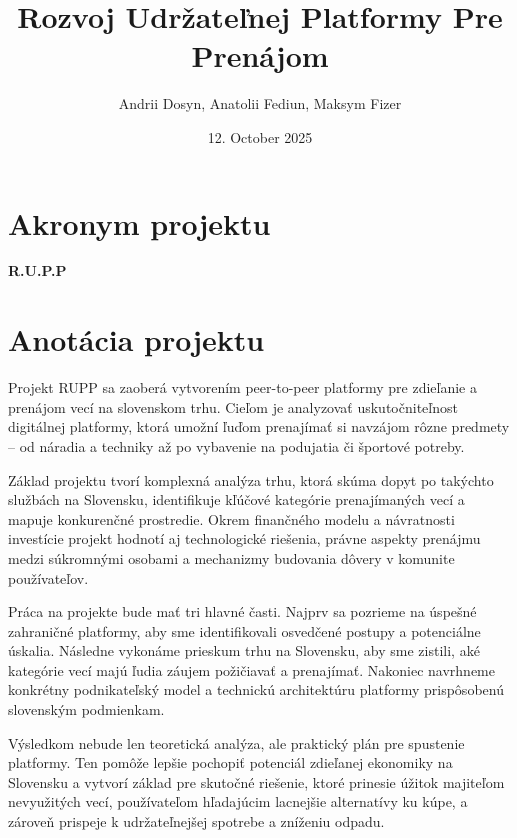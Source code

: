 \documentclass[12pt,twoside,slovak,a4paper]{article}
\title{\textbf{Rozvoj Udržateľnej Platformy Pre Prenájom}} %
\author{Andrii Dosyn, Anatolii Fediun, Maksym Fizer}
\date{\small 12. October 2025} %
\begin{document}
\maketitle

\section*{Akronym projektu}
\textbf{R.U.P.P }


\section*{Anotácia projektu}

Projekt RUPP sa zaoberá vytvorením peer-to-peer platformy pre zdieľanie a prenájom vecí na slovenskom trhu. Cieľom je analyzovať uskutočniteľnost digitálnej platformy, ktorá umožní ľuďom prenajímať si navzájom rôzne predmety – od náradia a techniky až po vybavenie na podujatia či športové potreby. 

Základ projektu tvorí komplexná analýza trhu, ktorá skúma dopyt po takýchto službách na Slovensku, identifikuje kľúčové kategórie prenajímaných vecí a mapuje konkurenčné prostredie. Okrem finančného modelu a návratnosti investície projekt hodnotí aj technologické riešenia, právne aspekty prenájmu medzi súkromnými osobami a mechanizmy budovania dôvery v komunite používateľov.

Práca na projekte bude mať tri hlavné časti. Najprv sa pozrieme na úspešné zahraničné platformy, aby sme identifikovali osvedčené postupy a potenciálne úskalia. Následne vykonáme prieskum trhu na Slovensku, aby sme zistili, aké kategórie vecí majú ľudia záujem požičiavať a prenajímať. Nakoniec navrhneme konkrétny podnikateľský model a technickú architektúru platformy prispôsobenú slovenským podmienkam. 

Výsledkom nebude len teoretická analýza, ale praktický plán pre spustenie platformy. Ten pomôže lepšie pochopiť potenciál zdieľanej ekonomiky na Slovensku a vytvorí základ pre skutočné riešenie, ktoré prinesie úžitok majiteľom nevyužitých vecí, používateľom hľadajúcim lacnejšie alternatívy ku kúpe, a zároveň prispeje k udržateľnejšej spotrebe a zníženiu odpadu.
\end{document}
